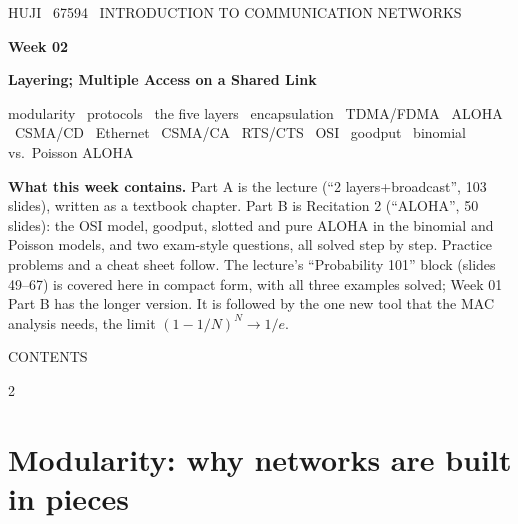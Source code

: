 {\ttfamily\small\color{pgreen}HUJI \textperiodcentered\ 67594 \textperiodcentered\ INTRODUCTION TO COMMUNICATION NETWORKS}\par\vspace{6pt}
{\sffamily\bfseries\fontsize{30}{34}\selectfont\color{pgold}Week 02}\par\vspace{4pt}
{\sffamily\bfseries\Large\color{pgold}Layering; Multiple Access on a Shared Link}\par\vspace{4pt}
{\raggedright\ttfamily\small\color{pcyan}modularity \textperiodcentered\ protocols \textperiodcentered\ the five layers \textperiodcentered\ encapsulation \textperiodcentered\ TDMA/FDMA \textperiodcentered\ ALOHA \textperiodcentered\ CSMA/CD \textperiodcentered\ Ethernet \textperiodcentered\ CSMA/CA \textperiodcentered\ RTS/CTS \textperiodcentered\ OSI \textperiodcentered\ goodput \textperiodcentered\ binomial vs.\ Poisson ALOHA\par}
\vspace{0.8em}

\begin{plainbox}
\textbf{What this week contains.} Part A is the lecture (``2 layers+broadcast'', 103 slides), written as a textbook chapter. Part B is Recitation 2 (``ALOHA'', 50 slides):
the OSI model, goodput, slotted and pure ALOHA in the binomial and Poisson models, and two exam-style questions, all solved step by step. Practice problems and a cheat sheet follow.
The lecture's ``Probability 101'' block (slides 49--67) is covered here in compact form, with all three examples solved; Week 01 Part B has the longer version.
It is followed by the one new tool that the MAC analysis needs, the limit $(1-1/N)^N\to1/e$.
\end{plainbox}

{\ttfamily\small\color{pgreen}CONTENTS}
\begin{multicols}{2}\footnotesize\setlength{\parskip}{0pt}
\setcounter{tocdepth}{1}
\makeatletter{}\makeatother
\end{multicols}


\section{Modularity: why networks are built in pieces}

